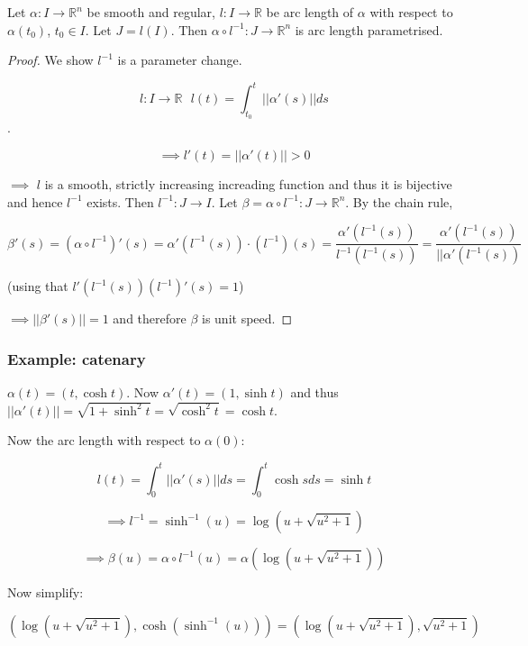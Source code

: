 \vspace{\baselineskip}

Let $\alpha : I \rightarrow \mathbb{R}^n$ be smooth and regular, $l : I \rightarrow \mathbb{R}$ be arc length of $\alpha$ with respect to $\alpha(t_0)$, $t_0 \in I$. Let $J = l(I)$. Then $\alpha \circ l^{-1} : J \rightarrow \mathbb{R}^n$ is arc length parametrised.

\begin{proof}

We show $l^{-1}$ is a parameter change.

$$l : I \rightarrow \mathbb{R} \, \, \, \, l(t) = \int_{t_0}^t || \alpha ' (s) || ds$$.

$$\implies l' (t) = || \alpha ' (t) || > 0$$

$\implies$ $l$ is a smooth, strictly increasing increading function and thus it is bijective and hence $l^{-1}$ exists. Then $l^{-1} : J \rightarrow I$. Let $\beta = \alpha \circ l^{-1} : J \rightarrow \mathbb{R}^n$. By the chain rule, 

$$\beta ' (s) = (\alpha \circ l^{-1})' (s) = \alpha ' (l^{-1} (s)) \cdot (l^{-1})(s) = \frac{\alpha ' (l^{-1} (s))}{l^{-1} (l^{-1} (s))} = \frac{\alpha ' (l^{-1} (s))}{||\alpha ' (l^{-1} (s))}$$

(using that $l' (l^{-1} (s)) (l^{-1})' (s) = 1$)

$\implies || \beta ' (s) || = 1$ and therefore $\beta$ is unit speed.

\end{proof}

\subsubsection*{Example: catenary}

$\alpha (t) = (t, \cosh t)$. Now $\alpha ' (t) = (1, \sinh t)$ and thus $|| \alpha ' (t) || = \sqrt{1+\sinh^2 t} = \sqrt{\cosh^2 t} = \cosh t$.

Now the arc length with respect to $\alpha (0)$:

$$l(t) = \int_0^t || \alpha ' (s) || ds = \int_0^t \cosh s ds = \sinh t$$

$$\implies l^{-1} = \sinh^{-1} (u) = \log (u + \sqrt{u^2 + 1})$$

$$\implies \beta (u) = \alpha \circ l^{-1} (u) = \alpha (\log (u + \sqrt{u^2 + 1}))$$

Now simplify:

$$(\log (u + \sqrt{u^2 + 1}), \cosh (\sinh^{-1} (u))) = (\log (u + \sqrt{u^2 + 1}), \sqrt{u^2 + 1})$$